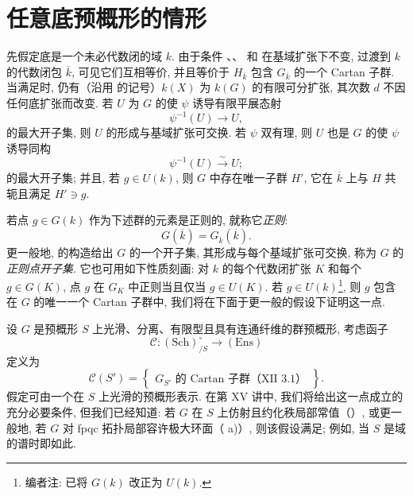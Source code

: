\makeatletter
{}
\makeatother

\section{任意底预概形的情形}

先假定底是一个未必代数闭的域 \(k\). 由于条件  、、 和  在基域扩张下不变, 过渡到 \(k\) 的代数闭包 \(\overline{k}\), 可见它们互相等价, 并且等价于 \(H_{\overline{k}}\) 包含 \(G_{\overline{k}}\) 的一个 Cartan 子群. 当满足时, 仍有（沿用  的记号）\(k(X)\) 为 \(k(G)\) 的有限可分扩张, 其次数 \(d\) 不因任何底扩张而改变. 若 \(U\) 为 \(G\) 的使 \(\psi\) 诱导有限平展态射
\[
  \psi^{-1}(U)\longrightarrow U,
\]
的最大开子集, 则 \(U\) 的形成与基域扩张可交换. 若 \(\psi\) 双有理, 则 \(U\) 也是 \(G\) 的使 \(\psi\) 诱导同构
\[
  \psi^{-1}(U)\xrightarrow{\sim}U;
\]
的最大开子集; 并且, 若 \(g\in U(k)\), 则 \(G\) 中存在唯一子群 \(H'\), 它在 \(\overline{k}\) 上与 \(H\) 共轭且满足 \(H'\ni g\).

若点 \(g\in G(k)\) 作为下述群的元素是正则的, 就称它\emph{正则}:
\[
  G(\overline{k})=G_{\overline{k}}(\overline{k}).
\]
更一般地,  的构造给出 \(G\) 的一个开子集, 其形成与每个基域扩张可交换, 称为 \(G\) 的\emph{正则点开子集}. 它也可用如下性质刻画: 对 \(k\) 的每个代数闭扩张 \(K\) 和每个 \(g\in G(K)\), 点 \(g\) 在 \(G_K\) 中正则当且仅当 \(g\in U(K)\). 若 \(g\in U(k)\)\footnote{编者注: 已将 \(G(k)\) 改正为 \(U(k)\).}, 则 \(g\) 包含在 \(G\) 的唯一一个 Cartan 子群中, 我们将在下面于更一般的假设下证明这一点.

设 \(G\) 是预概形 \(S\) 上光滑、分离、有限型且具有连通纤维的群预概形, 考虑函子
\[
  \mathcal C:(\mathrm{Sch})^\circ_{/S}\longrightarrow(\mathrm{Ens})
\]
定义为
\[
  \mathcal C(S')
  =
  \left\{
    \begin{array}{c}
      \text{\(G_{S'}\) 的 Cartan 子群（XII~3.1）}
    \end{array}
  \right\}.
\]
假定可由一个在 \(S\) 上光滑的预概形表示. 在第 XV 讲中, 我们将给出这一点成立的充分必要条件, 但我们已经知道: 若 \(G\) 在 \(S\) 上仿射且约化秩局部常值（）, 或更一般地, 若 \(G\) 对 fpqc 拓扑局部容许极大环面（ a)）, 则该假设满足; 例如, 当 \(S\) 是域的谱时即如此.

